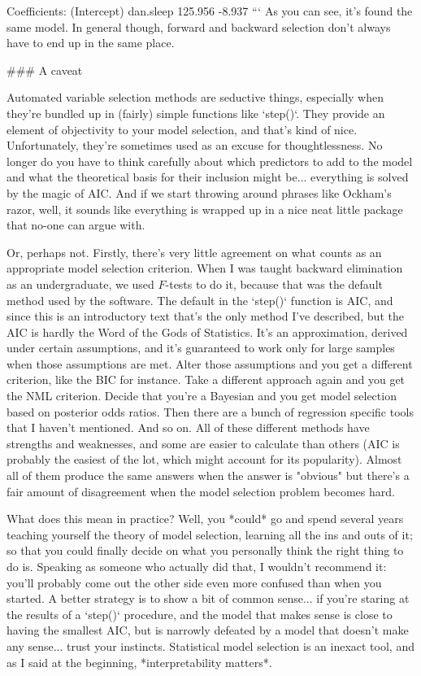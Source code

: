 Coefficients:
(Intercept)    dan.sleep  
    125.956       -8.937  
```
As you can see, it's found the same model. In general though, forward and backward selection don't always have to end up in the same place.

### A caveat

Automated variable selection methods are seductive things, especially when they're bundled up in (fairly) simple functions like `step()`. They provide an element of objectivity to your model selection, and that's kind of nice. Unfortunately, they're sometimes used as an excuse for thoughtlessness. No longer do you have to think carefully about which predictors to add to the model and what the theoretical basis for their inclusion might be... everything is solved by the magic of AIC. And if we start throwing around phrases like Ockham's razor, well, it sounds like everything is wrapped up in a nice neat little package that no-one can argue with.

Or, perhaps not. Firstly, there's very little agreement on what counts as an appropriate model selection criterion. When I was taught backward elimination as an undergraduate, we used $F$-tests to do it, because that was the default method used by the software. The default in the `step()` function is AIC, and since this is an introductory text that's the only method I've described, but the AIC is hardly the Word of the Gods of Statistics. It's an approximation, derived under certain assumptions, and it's guaranteed to work only for large samples when those assumptions are met. Alter those assumptions and you get a different criterion, like the BIC for instance. Take a different approach again and you get the NML criterion. Decide that you're a Bayesian and you get model selection based on posterior odds ratios. Then there are a bunch of regression specific tools that I haven't mentioned. And so on. All of these different methods have strengths and weaknesses, and some are easier to calculate than others (AIC is probably the easiest of the lot, which might account for its popularity). Almost all of them produce the same answers when the answer is "obvious" but there's a fair amount of disagreement when the model selection problem becomes hard.

What does this mean in practice? Well, you *could* go and spend several years teaching yourself the theory of model selection, learning all the ins and outs of it; so that you could finally decide on what you personally think the right thing to do is. Speaking as someone who actually did that, I wouldn't recommend it: you'll probably come out the other side even more confused than when you started. A better strategy is to show a bit of common sense... if you're staring at the results of a `step()` procedure, and the model that makes sense is close to having the smallest AIC, but is narrowly defeated by a model that doesn't make any sense... trust your instincts. Statistical model selection is an inexact tool, and as I said at the beginning, *interpretability matters*. 

